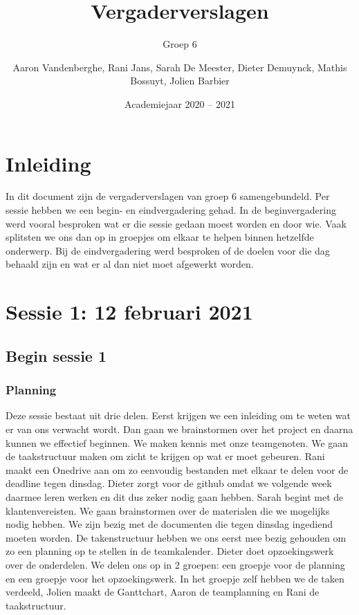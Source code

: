 \documentclass[a4paper,twoside,kulak]{kulakreport} %
\title{Vergaderverslagen}
\subtitle{Groep 6}
\author{Aaron Vandenberghe, Rani Jans, Sarah De Meester, Dieter Demuynck, Mathis Bossuyt, Jolien Barbier}
\institute{KU Leuven Kulak, Wetenschap \& Technologie}
\date{Academiejaar 2020 -- 2021}
\begin{document}
 

\titlepage

\tableofcontents


\chapter*{Inleiding}
In dit document zijn de vergaderverslagen van groep 6 samengebundeld. Per sessie hebben we een begin- en eindvergadering
gehad. In de beginvergadering werd vooral besproken wat er die sessie gedaan moest worden en door wie.  Vaak splitsten we ons dan op in groepjes om elkaar te helpen binnen hetzelfde onderwerp. Bij de eindvergadering werd besproken of de doelen voor die dag behaald zijn en wat er al dan niet moet afgewerkt worden. 

\chapter{Sessie 1: 12 februari 2021}
\section{Begin sessie 1}
\subsection{Planning}
Deze sessie  bestaat uit drie delen. Eerst krijgen we een inleiding om te weten wat er van ons verwacht wordt. Dan gaan we brainstormen over het project en daarna kunnen we effectief beginnen. We maken kennis met onze teamgenoten. We gaan de taakstructuur maken om zicht te krijgen op wat er moet gebeuren. Rani maakt een Onedrive aan om zo eenvoudig bestanden met elkaar te delen voor de deadline tegen dinsdag. Dieter zorgt voor de github omdat we volgende week daarmee leren werken en dit dus zeker nodig gaan hebben. %
Sarah begint met de klantenvereisten. We gaan brainstormen over de materialen die we mogelijks nodig hebben. We zijn bezig met de documenten die tegen dinsdag ingediend moeten worden. De takenstructuur hebben we ons eerst mee bezig gehouden om zo een planning op te stellen in de teamkalender. %
Dieter doet opzoekingswerk over de onderdelen. We delen ons op in 2 groepen: een groepje voor de planning en een groepje voor het opzoekingswerk. In het groepje zelf hebben we de taken verdeeld, Jolien maakt de Ganttchart, Aaron de teamplanning en Rani de taakstructuur. 
\end{document}
